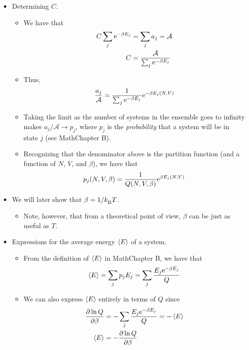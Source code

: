 \documentclass[../notes.tex]{subfiles}
\begin{document}
\begin{itemize}
    \item Determining $C$.
    \begin{itemize}
        \item We have that
        \begin{align*}
            C\sum_j\e[-\beta E_j] &= \sum_ja_j = \mathcal{A}\\
            C &= \frac{\mathcal{A}}{\sum_j\e[-\beta E_j]}
        \end{align*}
        \item Thus,
        \begin{equation*}
            \frac{a_j}{\mathcal{A}} = \frac{1}{\sum_j\e[-\beta E_j]}\e[-\beta E_j(N,V)]
        \end{equation*}
        \item Taking the limit as the number of systems in the ensemble goes to infinity makes $a_j/\mathcal{A}\to p_j$, where $p_j$ is the \emph{probability} that a system will be in state $j$ (see MathChapter B).
        \item Recognizing that the denominator above is the partition function (and a function of $N$, $V$, and $\beta$), we have that
        \begin{equation*}
            p_j(N,V,\beta) = \frac{1}{Q(N,V,\beta)}\e[\beta E_j(N,V)]
        \end{equation*}
    \end{itemize}
    \item We will later show that $\beta=1/\kB T$.
    \begin{itemize}
        \item Note, however, that from a theoretical point of view, $\beta$ can be just as useful as $T$.
    \end{itemize}
    \item Expressions for the average energy $\prb{E}$ of a system.
    \begin{itemize}
        \item From the definition of $\prb{E}$ in MathChapter B, we have that
        \begin{equation*}
            \prb{E} = \sum_j p_jE_j = \sum_j\frac{E_j\e[-\beta E_j]}{Q}
        \end{equation*}
        \item We can also express $\prb{E}$ entirely in terms of $Q$ since
        \begin{align*}
            \pdv{\ln Q}{\beta} &= -\sum_j\frac{E_j\e[-\beta E_j]}{Q} = -\prb{E}\\
            \prb{E} &= -\pdv{\ln Q}{\beta}

\end{align*}
\end{itemize}
\end{itemize}
\end{document}
